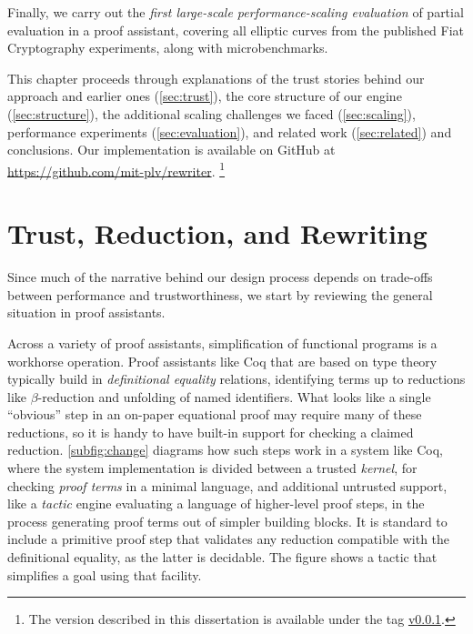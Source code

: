 Finally, we carry out the \emph{first large-scale performance-scaling evaluation} of partial evaluation in a proof assistant, covering all elliptic curves from the published Fiat Cryptography experiments, along with microbenchmarks.

This chapter proceeds through explanations of the trust stories behind our approach and earlier ones (\autoref{sec:trust}), the core structure of our engine (\autoref{sec:structure}), the additional scaling challenges we faced (\autoref{sec:scaling}), performance experiments (\autoref{sec:evaluation}), and related work (\autoref{sec:related}) and conclusions.
Our implementation is available on GitHub at \url{https://github.com/mit-plv/rewriter}.%
\footnote{%
  The version described in this dissertation is available under the tag \href{https://github.com/mit-plv/rewriter/tree/v0.0.1}{v0.0.1}.
}


\section{Trust, Reduction, and Rewriting}\label{sec:trust}

Since much of the narrative behind our design process depends on trade-offs between performance and trustworthiness, we start by reviewing the general situation in proof assistants.

Across a variety of proof assistants, simplification of functional programs is a workhorse operation.
Proof assistants like Coq that are based on type theory typically build in \emph{definitional equality} relations, identifying terms up to reductions like $\beta$-reduction and unfolding of named identifiers.
What looks like a single ``obvious'' step in an on-paper equational proof may require many of these reductions, so it is handy to have built-in support for checking a claimed reduction.
\autoref{subfig:change} diagrams how such steps work in a system like Coq, where the system implementation is divided between a trusted \emph{kernel}, for checking \emph{proof terms} in a minimal language, and additional untrusted support, like a \emph{tactic} engine evaluating a language of higher-level proof steps, in the process generating proof terms out of simpler building blocks.
It is standard to include a primitive proof step that validates any reduction compatible with the definitional equality, as the latter is decidable.
The figure shows a tactic that simplifies a goal using that facility.

